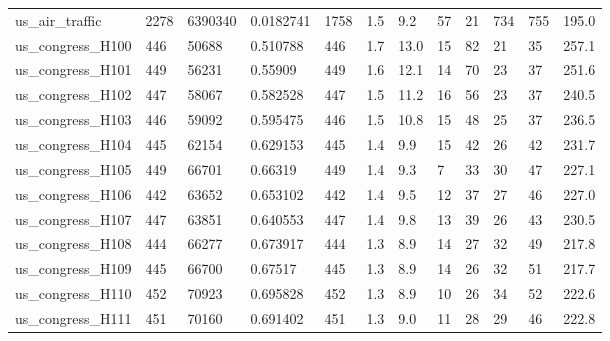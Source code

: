 \begin{longtable}{llllllllllll}
 us\_air\_traffic                                     & 2278       & 6390340   & 0.0182741   & 1758  & 1.5    & 9.2    & 57    & 21     & 734    & 755    & 195.0   \\
 us\_congress\_H100                                   & 446        & 50688     & 0.510788    & 446   & 1.7    & 13.0   & 15    & 82     & 21     & 35     & 257.1   \\
 us\_congress\_H101                                   & 449        & 56231     & 0.55909     & 449   & 1.6    & 12.1   & 14    & 70     & 23     & 37     & 251.6   \\
 us\_congress\_H102                                   & 447        & 58067     & 0.582528    & 447   & 1.5    & 11.2   & 16    & 56     & 23     & 37     & 240.5   \\
 us\_congress\_H103                                   & 446        & 59092     & 0.595475    & 446   & 1.5    & 10.8   & 15    & 48     & 25     & 37     & 236.5   \\
 us\_congress\_H104                                   & 445        & 62154     & 0.629153    & 445   & 1.4    & 9.9    & 15    & 42     & 26     & 42     & 231.7   \\
 us\_congress\_H105                                   & 449        & 66701     & 0.66319     & 449   & 1.4    & 9.3    & 7     & 33     & 30     & 47     & 227.1   \\
 us\_congress\_H106                                   & 442        & 63652     & 0.653102    & 442   & 1.4    & 9.5    & 12    & 37     & 27     & 46     & 227.0   \\
 us\_congress\_H107                                   & 447        & 63851     & 0.640553    & 447   & 1.4    & 9.8    & 13    & 39     & 26     & 43     & 230.5   \\
 us\_congress\_H108                                   & 444        & 66277     & 0.673917    & 444   & 1.3    & 8.9    & 14    & 27     & 32     & 49     & 217.8   \\
 us\_congress\_H109                                   & 445        & 66700     & 0.67517     & 445   & 1.3    & 8.9    & 14    & 26     & 32     & 51     & 217.7   \\
 us\_congress\_H110                                   & 452        & 70923     & 0.695828    & 452   & 1.3    & 8.9    & 10    & 26     & 34     & 52     & 222.6   \\
 us\_congress\_H111                                   & 451        & 70160     & 0.691402    & 451   & 1.3    & 9.0    & 11    & 28     & 29     & 46     & 222.8   \\

\end{longtable}
